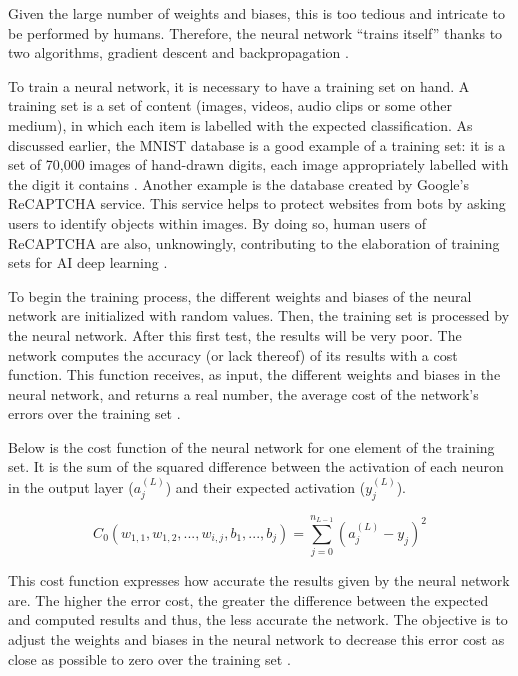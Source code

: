 ﻿\documentclass[12pt,a4paper,notitlepage]{article}
\begin{document}
Given the large number of weights and biases, this is too tedious and intricate to be performed by humans. Therefore, the neural network “trains itself” thanks to two algorithms, gradient descent and backpropagation \cite{ibm_cloud_education_what_2020}.

To train a neural network, it is necessary to have a training set on hand. A training set is a set of content (images, videos, audio clips or some other medium), in which each item is labelled with the expected classification. As discussed earlier, the MNIST database is a good example of a training set: it is a set of 70,000 images of hand-drawn digits, each image appropriately labelled with the digit it contains \cite{lecun_mnist_1998}. Another example is the database created by Google's ReCAPTCHA service. This service helps to protect websites from bots by asking users to identify objects within images. By doing so, human users of ReCAPTCHA are also, unknowingly, contributing to the elaboration of training sets for AI deep learning \cite{maruzani_are_2021}.

To begin the training process, the different weights and biases of the neural network are initialized with random values. Then, the training set is processed by the neural network. After this first test, the results will be very poor. The network computes the accuracy (or lack thereof) of its results with a cost function. This function receives, as input, the different weights and biases in the neural network, and returns a real number, the average cost of the network's errors over the training set \cite{sanderson_gradient_2017}.

Below is the cost function of the neural network for one element of the training set. It is the sum of the squared difference between the activation of each neuron in the output layer (\(a_{j}^{(L)}\)) and their expected activation (\(y_{j}^{(L)}\)).

\begin{displaymath}
 C_{0}(w_{1,1}, w_{1,2}, ..., w_{i,j}, b_{1}, ... ,b_{j}) = \sum_{j=0}^{n_{L - 1}} (a_{j}^{(L)} - y_{j})^{2}
\end{displaymath}

This cost function expresses how accurate the results given by the neural network are. The higher the error cost, the greater the difference between the expected and computed results and thus, the less accurate the network. The objective is to adjust the weights and biases in the neural network to decrease this error cost as close as possible to zero over the training set \cite{sanderson_gradient_2017}.
\end{document}
